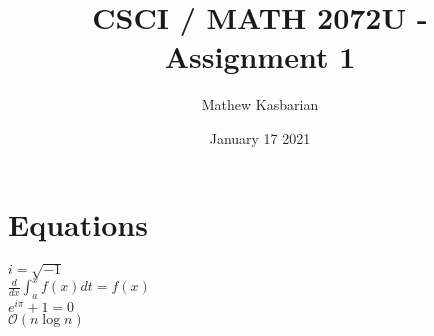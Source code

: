 \documentclass{article}
\title{CSCI / MATH 2072U - Assignment 1}
\author{Mathew Kasbarian}         %
\date{January 17 2021}           %
\begin{document}
\maketitle

\section{Equations}

$i=\sqrt{-1}$\\
$\frac{d}{dx}\int_a^xf(x)dt=f(x)$\\
$e^{i\pi}+1=0$\\
$\mathcal{O}(n\log{}n)$
\end{document}
